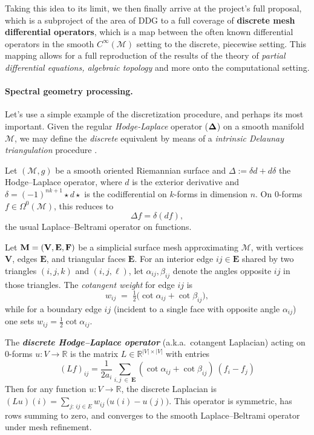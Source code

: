 \spa

Taking this idea to its limit, we then
finally arrive at the project's full proposal,
which is a subproject of the area of DDG
to a full coverage of \textbf{discrete mesh differential operators}, which is a
map between the often known differential
operators in the smooth $C^\infty(\mathcal{M})$
setting to the discrete, piecewise setting.
This mapping allows for a full reproduction
of the results of the theory of \textit{partial
differential equations, algebraic topology} and more
onto the computational setting.


\spa

\paragraph{Spectral geometry processing.} Let's use a simple example of the discretization procedure,
and perhaps its most important.
Given the regular \textit{Hodge-Laplace} operator ($\bf{\Delta}$) on a smooth
manifold $\mathcal{M}$, we may define the \textit{discrete} equivalent
by means of a \textit{intrinsic Delaunay triangulation} procedure \cite{laplacian0}. 

\begin{definition}
Let $(\mathcal{M},g)$ be a smooth oriented Riemannian surface and 
$\Delta := \delta d + d \delta$ the Hodge--Laplace operator, where
$d$ is the exterior derivative and $\delta = (-1)^{nk+1} \star d \star$ is the codifferential
on $k$-forms in dimension $n$. 
On $0$-forms $f \in \Omega^0(\mathcal{M})$, this reduces to
\[
   \Delta f = \delta (df),
\]
the usual Laplace--Beltrami operator on functions.

\spa

Let $\bf M=(V,E,F)$ be a simplicial surface mesh approximating $\mathcal{M}$, with
vertices $\mathbf{V}$, edges $\mathbf{E}$, and triangular faces $\mathbf{E}$. For an interior edge 
$ij \in \mathbf{E}$ shared by two triangles $(i,j,k)$ and $(i,j,\ell)$, let
$\alpha_{ij}, \beta_{ij}$ denote the angles opposite $ij$ in those triangles. 
The \emph{cotangent weight} for edge $ij$ is
\[
   w_{ij} \;=\; \tfrac{1}{2}\big(\cot \alpha_{ij} + \cot \beta_{ij}\big),
\]
while for a boundary edge $ij$ (incident to a single face with opposite angle
$\alpha_{ij}$) one sets $w_{ij} = \tfrac{1}{2}\cot \alpha_{ij}$.

\spa

The \textbf{\emph{discrete Hodge--Laplace operator}} (a.k.a.\ cotangent Laplacian)
acting on $0$-forms $u:V\to\mathbb{R}$ is the matrix
$L \in \mathbb{R}^{|V|\times |V|}$ with entries
\[
   (L f)_{ij} = \frac{1}{2a_i} \sum_{i,j \ \in \ \mathbf{E}} (\cot \alpha_{ij} +
   \cot \beta_{ij}) \ (f_i -f_j)
\]
Then for any function $u:V\to \mathbb{R}$, the discrete Laplacian is 
$(Lu)(i) = \sum_{j:\, ij\in E} w_{ij}\,\big(u(i)-u(j)\big)$.
This operator is symmetric, has rows summing to zero, and
converges to the smooth Laplace--Beltrami operator under mesh refinement.
\end{definition}

